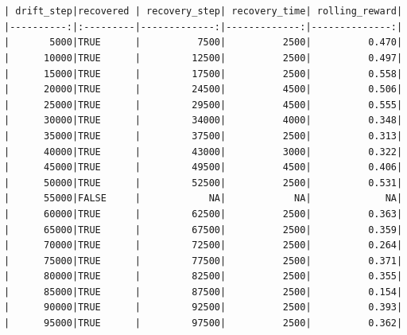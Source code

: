 \documentclass[
  letterpaper,
  DIV=11,
  numbers=noendperiod]{scrartcl}
\begin{document}
\begin{verbatim}


| drift_step|recovered | recovery_step| recovery_time| rolling_reward|
|----------:|:---------|-------------:|-------------:|--------------:|
|       5000|TRUE      |          7500|          2500|          0.470|
|      10000|TRUE      |         12500|          2500|          0.497|
|      15000|TRUE      |         17500|          2500|          0.558|
|      20000|TRUE      |         24500|          4500|          0.506|
|      25000|TRUE      |         29500|          4500|          0.555|
|      30000|TRUE      |         34000|          4000|          0.348|
|      35000|TRUE      |         37500|          2500|          0.313|
|      40000|TRUE      |         43000|          3000|          0.322|
|      45000|TRUE      |         49500|          4500|          0.406|
|      50000|TRUE      |         52500|          2500|          0.531|
|      55000|FALSE     |            NA|            NA|             NA|
|      60000|TRUE      |         62500|          2500|          0.363|
|      65000|TRUE      |         67500|          2500|          0.359|
|      70000|TRUE      |         72500|          2500|          0.264|
|      75000|TRUE      |         77500|          2500|          0.371|
|      80000|TRUE      |         82500|          2500|          0.355|
|      85000|TRUE      |         87500|          2500|          0.154|
|      90000|TRUE      |         92500|          2500|          0.393|
|      95000|TRUE      |         97500|          2500|          0.362|
\end{verbatim}
\end{document}
